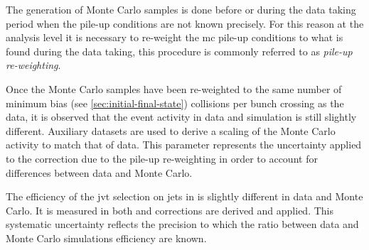 The generation of Monte Carlo samples is done before or during the data taking
period when the pile-up conditions are not known precisely. For this reason at
the analysis level it is necessary to re-weight the \gls{mc} pile-up conditions
to what is found during the data taking, this procedure is commonly referred to
as \emph{pile-up re-weighting}.
\begin{description}[font=\normalfont]
\item[syst\_PRW\_DATASF:] Once the Monte Carlo samples have been re-weighted to
  the same number of minimum bias (see \cref{sec:initial-final-state})
  collisions per bunch crossing as the data, it is observed that the event
  activity in data and simulation is still slightly different. Auxiliary
  datasets are used to derive a scaling of the Monte Carlo activity to match
  that of data. This parameter represents the uncertainty applied to the
  correction due to the pile-up re-weighting in order to account for differences
  between data and Monte Carlo.
\item[syst\_JvtEfficiency:] The efficiency of the \gls{jvt} selection on jets in
  is slightly different in data and Monte Carlo. It is measured in both and
  corrections are derived and applied. This systematic uncertainty reflects the
  precision to which the ratio between data and Monte Carlo simulations
  efficiency are known.
\end{description}
